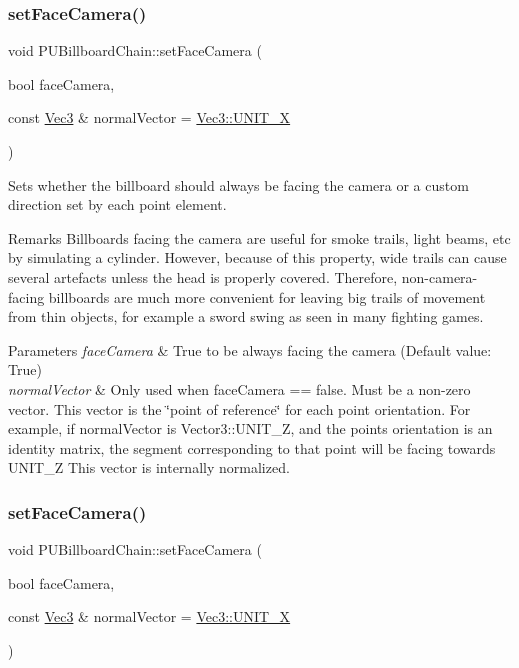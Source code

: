 \subsubsection{\texorpdfstring{set\+Face\+Camera()}{setFaceCamera()}\hspace{0.1cm}{\footnotesize\ttfamily [1/2]}}
{\footnotesize\ttfamily void P\+U\+Billboard\+Chain\+::set\+Face\+Camera (\begin{DoxyParamCaption}\item[{bool}]{face\+Camera,  }\item[{const \hyperlink{classVec3}{Vec3} \&}]{normal\+Vector = {\ttfamily \hyperlink{classVec3_a859e21c0e95524033d5322f815127ff3}{Vec3\+::\+U\+N\+I\+T\+\_\+X}} }\end{DoxyParamCaption})}

Sets whether the billboard should always be facing the camera or a custom direction set by each point element. \begin{DoxyRemark}{Remarks}
Billboards facing the camera are useful for smoke trails, light beams, etc by simulating a cylinder. However, because of this property, wide trails can cause several artefacts unless the head is properly covered. Therefore, non-\/camera-\/facing billboards are much more convenient for leaving big trails of movement from thin objects, for example a sword swing as seen in many fighting games. 
\end{DoxyRemark}

\begin{DoxyParams}{Parameters}
{\em face\+Camera} & True to be always facing the camera (Default value\+: True) \\
\hline
{\em normal\+Vector} & Only used when face\+Camera == false. Must be a non-\/zero vector. This vector is the \char`\"{}point of reference\char`\"{} for each point orientation. For example, if normal\+Vector is Vector3\+::\+U\+N\+I\+T\+\_\+Z, and the point\textquotesingle{}s orientation is an identity matrix, the segment corresponding to that point will be facing towards U\+N\+I\+T\+\_\+Z This vector is internally normalized. \\
\hline
\end{DoxyParams}
\mbox{\label{classPUBillboardChain_a3cf5eab8b485ab9cafd87fd58623a288}} 
\subsubsection{\texorpdfstring{set\+Face\+Camera()}{setFaceCamera()}\hspace{0.1cm}{\footnotesize\ttfamily [2/2]}}
{\footnotesize\ttfamily void P\+U\+Billboard\+Chain\+::set\+Face\+Camera (\begin{DoxyParamCaption}\item[{bool}]{face\+Camera,  }\item[{const \hyperlink{classVec3}{Vec3} \&}]{normal\+Vector = {\ttfamily \hyperlink{classVec3_a859e21c0e95524033d5322f815127ff3}{Vec3\+::\+U\+N\+I\+T\+\_\+X}} }\end{DoxyParamCaption})}

